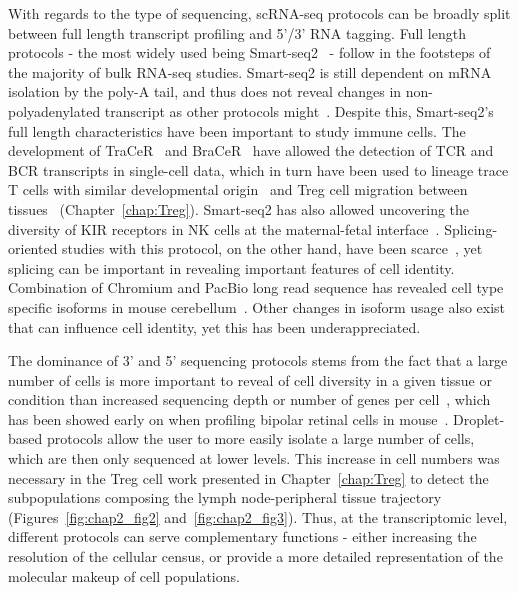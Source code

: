 With regards to the type of sequencing, scRNA-seq protocols can be broadly split between full length transcript profiling and 5'/3' RNA tagging. Full length protocols - the most widely used being Smart-seq2~\citep{picelli_full-length_2014} - follow in the footsteps of the majority of bulk RNA-seq studies. Smart-seq2 is still dependent on mRNA isolation by the poly-A tail, and thus does not reveal changes in non-polyadenylated transcript as other protocols might~\citep{hayashi_single-cell_2018,verboom_smarter_2019}. Despite this, Smart-seq2's full length characteristics have been important to study immune cells. The development of TraCeR~\citep{stubbington_t_2016} and BraCeR~\citep{lindeman_bracer:_2018} have allowed the detection of TCR and BCR transcripts in single-cell data, which in turn have been used to lineage trace T cells with similar developmental origin~\citep{lonnberg_single-cell_2017} and Treg cell migration between tissues~\citep{miragaia_single-cell_2019} (Chapter~\ref{chap:Treg}). Smart-seq2 has also allowed uncovering the diversity of KIR receptors in NK cells at the maternal-fetal interface~\citep{vento-tormo_single-cell_2018}. Splicing-oriented studies with this protocol, on the other hand, have been scarce~\citep{arzalluz-luque_single-cell_2018}, yet splicing can be important in revealing important features of cell identity. Combination of Chromium and PacBio long read sequence has revealed cell type specific isoforms in mouse cerebellum~\citep{gupta_single-cell_2018}. Other changes in isoform usage also exist that can influence cell identity, yet this has been underappreciated.

The dominance of 3' and 5' sequencing protocols stems from the fact that a large number of cells is more important to reveal of cell diversity in a given tissue or condition than increased sequencing depth or number of genes per cell~\citep{svensson_quantifying_2019}, which has been showed early on when profiling bipolar retinal cells in mouse~\citep{shekhar_comprehensive_2016}. Droplet-based protocols allow the user to more easily isolate a large number of cells, which are then only sequenced at lower levels. This increase in cell numbers was necessary in the Treg cell work presented in Chapter~\ref{chap:Treg} to detect the subpopulations composing the lymph node-peripheral tissue trajectory (Figures~\ref{fig:chap2_fig2} and~\ref{fig:chap2_fig3}). Thus, at the transcriptomic level, different protocols can serve complementary functions - either increasing the resolution of the cellular census, or provide a more detailed representation of the molecular makeup of cell populations.


